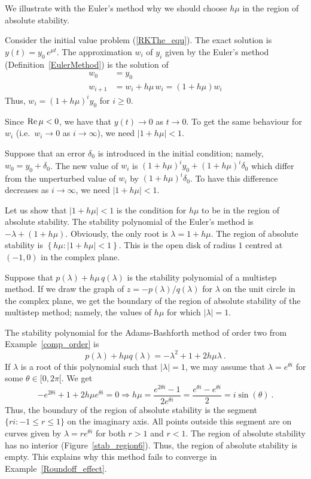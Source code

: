 \begin{egg}
We illustrate with the Euler's method why we should choose $h\mu$ in
the region of absolute stability.

Consider the initial value problem (\ref{RKThe_equ}).  The exact
solution is $y(t) = y_0\,e^{\mu t}$.  The approximation $w_i$ of
$y_i$ given by the Euler's method (Definition~\ref{EulerMethod}) is
the solution of
\begin{align*}
w_0 &= y_0 \\
w_{i+1} &= w_i + h\mu\, w_i = (1+h\mu)w_i
\end{align*}
Thus, $w_i = (1+h\mu)^iy_0$ for $i\geq 0$.

Since $\operatorname{Re} \mu<0$, we have that $y(t) \rightarrow 0$ as $t \rightarrow 0$.
To get the same behaviour for $w_i$
(i.e.\ $w_i \rightarrow 0$ as $i \rightarrow \infty$), we
need  $|1+h\mu| < 1$.

Suppose that an error $\delta_0$ is introduced in the initial
condition; namely, $w_0 = y_0 + \delta_0$.  The new value of $w_i$ is
$(1+h\mu)^i y_0 + (1+h\mu)^i \delta_0$ which differ from the
unperturbed value of $w_i$ by $(1+h\mu)^i \delta_0$.  To have this
difference decreases as $i \rightarrow \infty$, we need
$|1+h\mu| < 1$.

Let us show that $|1+h\mu| < 1$ is the condition for $h\mu$ to be in the
region of absolute stability.  The stability polynomial of the Euler's
method is $-\lambda + (1+h\mu)$.
Obviously, the only root is $\lambda = 1 + h\mu$.  The region of
absolute stability is
$\left\{ h\mu : |1 + h\mu| < 1 \right\}$.  This is the open disk of
radius $1$ centred at $(-1,0)$ in the complex plane.
\end{egg}

\begin{rmk}
Suppose that $p(\lambda) + h\mu\, q(\lambda)$ is the stability
polynomial of a multistep method.  If we draw the graph of
$z = - p(\lambda)/q(\lambda)$ for $\lambda$ on the unit circle in the
complex plane, we get the boundary of the region of absolute stability
of the multistep method; namely, the values of $h\mu$ for which
$|\lambda|=1$.
\end{rmk}

\begin{egg}
The stability polynomial for the Adams-Bashforth method of order two
from Example~\ref{comp_order} is
\[
  p(\lambda) + h\mu q(\lambda) = -\lambda^2 + 1 + 2h\mu \lambda \ .
\]
If $\lambda$ is a root of this polynomial such that $|\lambda| = 1$,
we may assume that $\lambda = e^{\theta i}$ for some $\theta \in [0,2\pi[$.
We get
\[
-e^{2\theta i} + 1 + 2h\mu e^{\theta i} = 0
\Rightarrow h \mu = \frac{e^{2\theta i} -1}{2e^{\theta i}}
= \frac{e^{\theta i} -e^{\theta i}}{2} = i\sin(\theta) \ .
\]
Thus, the boundary of the region of absolute stability is the segment
$\{ r i : -1 \leq r \leq 1\}$ on the imaginary axis.  All points
outside this segment are on curves given by $\lambda = r e^{\theta i}$
for both $r>1$ and $r<1$.  The region of absolute stability has no
interior (Figure~\ref{stab_region6}).  Thus, the region 
of absolute stability is empty.  This explains why this method
fails to converge in Example~\ref{Roundoff_effect}.
\end{egg}

